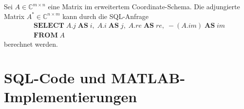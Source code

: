 Sei $A \in \mathbb{C}^{m \times n}$ eine Matrix im erweitertem Coordinate-Schema. Die adjungierte Matrix $A^* \in \mathbb{C}^{n \times m}$ kann durch die SQL-Anfrage
\begin{align*}
    & \mathbf{SELECT} \; A.j \; \mathbf{AS} \; i, \; A.i \; \mathbf{AS} \; j, \; A.re \;\mathbf{AS} \; re, \; -(A.im) \; \mathbf{AS} \; im  \\
    & \mathbf{FROM} \; A
\end{align*}
berechnet werden.
\section{SQL-Code und MATLAB-Implementierungen}
\label{app:app_2}

\label{mat:code:zyk}

\label{matlab:boundary}
